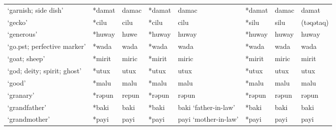 \begin{landscape}
\begin{longtable}[c]{@{}p{3cm}<{\raggedright}p{2.75cm}<{\raggedright}p{2.75cm}<{\raggedright}p{2.75cm}<{\raggedright}p{2.75cm}<{\raggedright}p{2.75cm}<{\raggedright}p{2.75cm}<{\raggedright}p{2.75cm}<{\raggedright}@{}}
`garnish; side dish'                                 & *damat             & damac                          & *damat             & damac                      & *damat           & damac                    & damat                             \\
`gecko'                                              & *cilu              & cilu                           & *cilu              & cilu                       & *silu            & silu                     & (təqətaq)                         \\
`generous'                                           & *huway             & huwe                           & *huway             & huway                      & *huway           & huway                    & huway                             \\
`go.pst; perfective marker'                          & *wada              & wada                           & *wada              & wada                       & *wada            & wada                     & wada                              \\
`goat; sheep'                                        & *mirit             & miric                          & *mirit             & miric                      & *mirit           & miric                    & mirit                             \\
`god; deity; spirit; ghost'                          & *utux              & utux                           & *utux              & utux                       & *utux            & utux                     & utux                              \\
`good'                                               & *malu              & malu                           & *malu              & malu                       & *malu            & malu                     & malu                              \\
`granary'                                            & *rəpun             & repun                          & *rəpun             & rəpun                      & *rəpun           & rəpun                    & rəpun                             \\
`grandfather'                                        & *baki              & baki                           & *baki              & baki `father-in-law'       & *baki            & baki                     & baki                              \\
`grandmother'                                        & *payi              & payi                           & *payi              & payi `mother-in-law'       & *payi            & payi                     & payi                              \\

\end{longtable}
\end{landscape}
